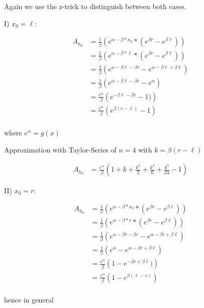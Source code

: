 \documentclass[]{article}
\begin{document}
Again we use the z-trick to distinguish between both cases.


I) $x_0 = \ell$:

\begin{align*}
	A_{h_0} &= \frac{1}{\beta} \left( e^{\alpha - \beta * x_0} * \left(e^{\beta r} - e^{\beta \ell} \right) \right) \\
	&= \frac{1}{\beta} \left( e^{\alpha - \beta * \ell} * \left(e^{\beta r} - e^{\beta \ell} \right) \right) \\
	&= \frac{1}{\beta} \left(e^{\alpha - \beta \ell - \beta r} - e^{\alpha - \beta \ell + \beta \ell} \right) \\
	&= \frac{1}{\beta} \left(e^{\alpha - \beta \ell - \beta r} - e^{\alpha} \right) \\
	&= \frac{e^{\alpha}}{\beta} \left(e^{- \beta \ell - \beta r} - 1) \right) \\
	&= \frac{e^{\alpha}}{\beta} \left(e^{\beta (r - \ell)} - 1 \right) \\
\end{align*}

where $e^{\alpha} = g(x)$

Approximation with Taylor-Series of $n = 4$ with $k = \beta (r - \ell)$

\begin{align*}
	A_{h_0} &= \frac{e^{\alpha}}{\beta} \left(1 + k + \frac{k^2}{2} +  \frac{k^3}{6} + \frac{k^4}{24} - 1 \right)
\end{align*}

II) $x_0 = r$:

\begin{align*}
	A_{h_0} &= \frac{1}{\beta} \left( e^{\alpha - \beta * x_0} * \left(e^{\beta r} - e^{\beta \ell} \right) \right) \\
	&= \frac{1}{\beta} \left( e^{\alpha - \beta * r} * \left(e^{\beta r} - e^{\beta \ell} \right) \right) \\
	&= \frac{1}{\beta} \left(e^{\alpha - \beta r - \beta r} - e^{\alpha - \beta r + \beta \ell} \right) \\
	&= \frac{1}{\beta} \left(e^{\alpha} - e^{\alpha - \beta r + \beta \ell} \right) \\
	&= \frac{e^{\alpha}}{\beta} \left(1 - e^{- \beta r + \beta \ell} ) \right) \\
	&= \frac{e^{\alpha}}{\beta} \left(1 - e^{\beta (\ell - r)}  \right) \\
\end{align*}

hence in general
\end{document}
